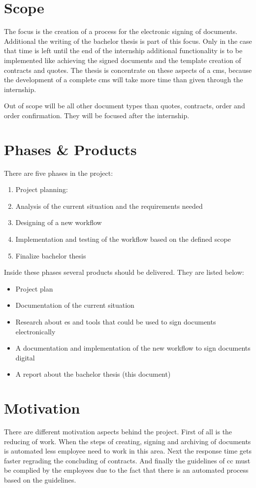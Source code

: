  \section{Scope}
 The focus is the creation of a process for the electronic signing of documents. Additional the writing of the bachelor thesis is part of this focus. Only in the case that time is left until the end of the internship additional functionality is to be implemented like achieving the signed documents and the template creation of contracts and quotes. The thesis is concentrate on these aspects of a \gls{cms}, because the development of a complete \gls{cms} will take more time than given through the internship. 
 
 Out of scope will be all other document types than quotes, contracts, order and order confirmation. They will be focused after the internship.
 
 \section{Phases \& Products} \label{sec:phases}
 There are five phases in the project:
 \begin{enumerate}
 	\item Project planning:
 	\item Analysis of the current situation and the requirements needed
 	\item Designing of a new workflow
 	\item Implementation and testing of the workflow based on the defined scope
 	\item Finalize bachelor thesis
 \end{enumerate}
 
 Inside these phases several products should be delivered. They are listed below:
 \begin{itemize}
 	\item Project plan
 	\item Documentation of the current situation
 	\item Research about \gls{es} and tools that could be used to sign documents electronically
 	\item A documentation and implementation of the new workflow to sign documents digital
 	\item A report about the bachelor thesis (this document)
 \end{itemize}
 
 \section{Motivation}
 There are different motivation aspects behind the project. First of all is the reducing of work. When the steps of creating, signing and archiving of documents is automated less employee need to work in this area. Next the response time gets faster regrading the concluding of contracts. And finally the guidelines of \gls{cc} must be complied by the employees due to the fact that there is an automated process based on the guidelines. 
